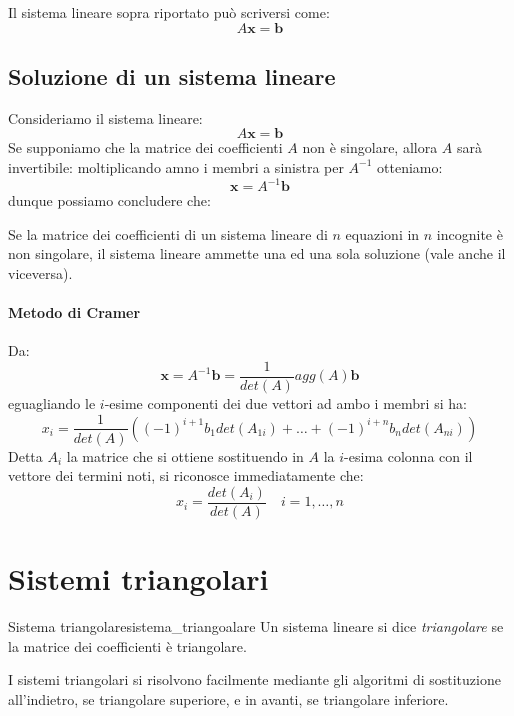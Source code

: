 \documentclass[12pt]{report}
\newcounter{theorem}
\newcounter{definition}
\newcommand{\nmu}{}
\begin{document}
Il sistema lineare sopra riportato può scriversi come:
\[
A\mathbf{x}= \mathbf{b}
\]
\subsection{Soluzione di un sistema lineare}
Consideriamo il sistema lineare:
\[
A\mathbf{x} = \mathbf{b}
\]
Se supponiamo che la matrice dei coefficienti $A$ non è singolare, allora $A$ sarà invertibile: moltiplicando amno i membri a sinistra per $A^{-1}$ otteniamo:
\[
\mathbf{x} = A^{-1}\mathbf{b}
\]
dunque possiamo concludere che:
\begin{theorem}{}{}
	Se la matrice dei coefficienti di un sistema lineare di $n$ equazioni in $n$ incognite è non singolare, il sistema lineare ammette una ed una sola soluzione (vale anche il viceversa).
\end{theorem}
\paragraph{Metodo di Cramer}
Da:
\[
\mathbf{x} = A^{-1}\mathbf{b} = \displaystyle\frac{1}{det(A)}agg(A)\mathbf{b}
\]
eguagliando le $i$-esime componenti dei due vettori ad ambo i membri si ha:
\[
x_i = \displaystyle\frac{1}{det(A)}((-1)^{i+1}b_1det(A_{1i}) + \dots + (-1)^{i+n}b_n det(A_{ni}))
\]
Detta $A_i$ la matrice che si ottiene sostituendo in $A$ la $i$-esima colonna con il vettore dei termini noti, si riconosce immediatamente che:
\[
x_i = \displaystyle\frac{det(A_i)}{det(A)} \quad i=1, \dots, n
\]
\section{Sistemi triangolari}
\begin{definition}{\nmu Sistema triangolare}{sistema_triangoalare}
	Un sistema lineare si dice \textit{triangolare} se la matrice dei coefficienti è triangolare.
\end{definition}
I sistemi triangolari si risolvono facilmente mediante gli algoritmi di sostituzione all'indietro, se triangolare superiore, e in avanti, se triangolare inferiore.
\end{document}
